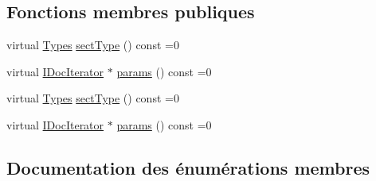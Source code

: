 \subsection*{Fonctions membres publiques}
\begin{DoxyCompactItemize}
\item 
virtual \hyperlink{class_i_doc_parameter_list_ad421a101c61e0e39266d2fde4ce5acc0}{Types} \hyperlink{class_i_doc_parameter_list_a94d0735672b68aceca651e9c45ccef99}{sect\+Type} () const  =0
\item 
virtual \hyperlink{class_i_doc_iterator}{I\+Doc\+Iterator} $\ast$ \hyperlink{class_i_doc_parameter_list_a23e3dae99cb9339d25cf2d2f30283f06}{params} () const  =0
\item 
virtual \hyperlink{class_i_doc_parameter_list_ad421a101c61e0e39266d2fde4ce5acc0}{Types} \hyperlink{class_i_doc_parameter_list_a94d0735672b68aceca651e9c45ccef99}{sect\+Type} () const  =0
\item 
virtual \hyperlink{class_i_doc_iterator}{I\+Doc\+Iterator} $\ast$ \hyperlink{class_i_doc_parameter_list_a23e3dae99cb9339d25cf2d2f30283f06}{params} () const  =0
\end{DoxyCompactItemize}


\subsection{Documentation des énumérations membres}
\hypertarget{class_i_doc_parameter_list_ad421a101c61e0e39266d2fde4ce5acc0}{}
